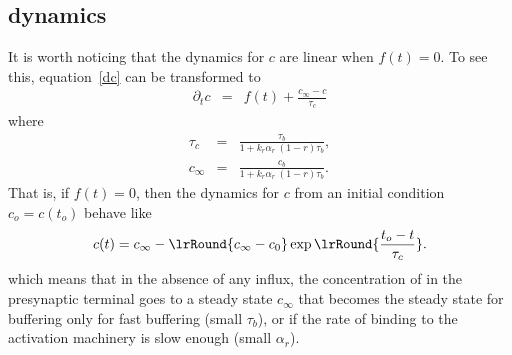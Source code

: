 \subsection{{\calcium} dynamics}

It is worth noticing that the dynamics for $c$ are linear when $f(t)=0$. To see this, equation~\eqref{dc} can be transformed to 
\begin{eqnarray*}
\partial_{t} c 
&=& f(t) + \frac{c_{\infty}-c}{\tau_{c}} 
\label{dc2}
\end{eqnarray*}
where 
\begin{eqnarray}
\tau_{c} &=& \frac{\tau_{b}}{1+ k_{r} \alpha_{r}~(1-r) \tau_{b} },
\\
c_{\infty} &=& \frac{c_{b}}{1+ k_{r} \alpha_{r}~(1-r) \tau_{b} }.
\end{eqnarray}
That is, if $f(t)=0$, then the dynamics for $c$ from an initial condition $c_{o}=c(t_{o})$ behave like 
$$c(t) = c_{\infty} - \lrRound{c_{\infty}- c_{0}}\exp \lrRound{\frac{t_{o}-t}{\tau_{c}}}.$$
which means that in the absence of any {\calcium} influx, the concentration of {\calcium} in the presynaptic terminal goes to a steady state $c_{\infty}$ that becomes the steady state for buffering only for fast buffering (small $\tau_{b}$), or if the rate of binding to the activation machinery is slow enough (small $\alpha_{r}$). 

